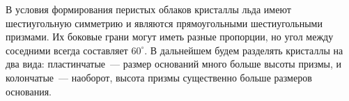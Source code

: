В условия формирования перистых облаков кристаллы льда имеют шестиугольную симметрию и являются прямоугольными шестиугольными призмами. Их боковые грани могут иметь разные пропорции, но угол между соседними всегда составляет $60^\circ$. В дальнейшем будем разделять кристаллы на два вида: пластинчатые~--- размер оснований много больше высоты призмы, и колончатые~--- наоборот, высота призмы существенно больше размеров основания.~\cite{Champion_1981}








